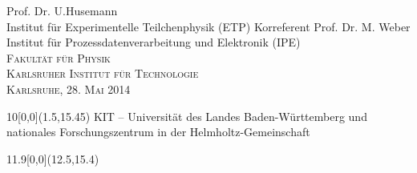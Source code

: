 \begin{titlepage}
\begin{center}
\normalsize{Prof. Dr. U.Husemann}\\[1ex ]\normalsize{Institut f\"ur Experimentelle Teilchenphysik (ETP)}
 \normalsize{Korreferent Prof. Dr. M. Weber}\\[1ex]
 \normalsize{Institut f\"ur Prozessdatenverarbeitung und Elektronik (IPE)}\\[6ex] 

\vspace*{20mm} 
\textsc{\Large{Fakult\"at f\"ur Physik \\[1ex] 
Karlsruher Institut f\"ur Technologie} \\[4ex] 
\normalsize{Karlsruhe, 28. Mai 2014}}


\end{center}

\begin{textblock}{10}[0,0](1.5,15.45)
\tiny{ 
KIT -- Universit\"at des Landes Baden-W\"urttemberg und nationales Forschungszentrum in der Helmholtz-Gemeinschaft
}
\end{textblock}

\begin{textblock}{11.9}[0,0](12.5,15.4)
\large{
}
\end{textblock}


\end{titlepage}

\cleardoublepage
\thispagestyle{empty}



